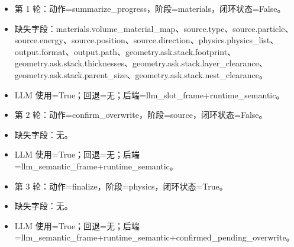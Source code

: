 \documentclass[11pt]{ctexart}
\begin{document}
\begin{itemize}
\item 第 1 轮：动作=summarize\_progress，阶段=materials，闭环状态=False。
\item 缺失字段：materials.volume\_material\_map、source.type、source.particle、source.energy、source.position、source.direction、physics.physics\_list、output.format、output.path、geometry.ask.stack.footprint、geometry.ask.stack.thicknesses、geometry.ask.stack.layer\_clearance、geometry.ask.stack.parent\_size、geometry.ask.stack.nest\_clearance。
\item LLM 使用=True；回退=无；后端=llm\_slot\_frame+runtime\_semantic。
\item 第 2 轮：动作=confirm\_overwrite，阶段=source，闭环状态=False。
\item 缺失字段：无。
\item LLM 使用=True；回退=无；后端=llm\_semantic\_frame+runtime\_semantic。
\item 第 3 轮：动作=finalize，阶段=physics，闭环状态=True。
\item 缺失字段：无。
\item LLM 使用=True；回退=无；后端=llm\_semantic\_frame+runtime\_semantic+confirmed\_pending\_overwrite。
\end{itemize}
\end{document}
